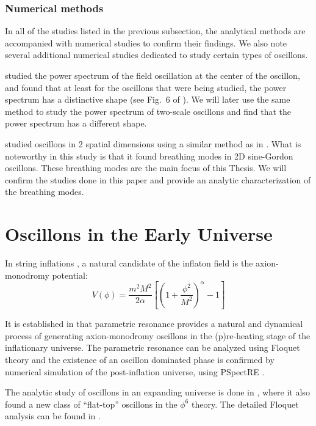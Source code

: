 \documentclass{report}
\begin{document}
\subsubsection{Numerical methods}
In all of the studies listed in the previous subsection, the analytical methods are accompanied with numerical studies to confirm their findings. We also note several additional numerical studies dedicated to study certain types of oscillons.

\cite{Salmi:2012ta} studied the power spectrum of the field oscillation at the center of the oscillon, and found that at least for the oscillons that were being studied, the power spectrum has a distinctive shape (see Fig.~6 of \cite{Hindmarsh:2006ur}). We will later use the same method to study the power spectrum of two-scale oscillons and find that the power spectrum has a different shape.

\cite{Hindmarsh:2006ur} studied oscillons in 2 spatial dimensions using a similar method as in \cite{Salmi:2012ta}. What is noteworthy in this study is that it found breathing modes in 2D sine-Gordon oscillons. These breathing modes are the main focus of this Thesis. We will confirm the studies done in this paper and provide an analytic characterization of the breathing modes.

\section{Oscillons in the Early Universe}
In string inflations \cite{stringInflationBook, McAllister:2008hb, Silverstein:2008sg, Flauger:2009ab}, a natural candidate of the inflaton field is the axion-monodromy potential:
\begin{equation}
  V(\phi) = \frac{m^2M^2}{2\alpha} \left[\left(1+\frac{\phi^2}{M^2}\right)^\alpha -1\right]
\end{equation}

It is established in \cite{Amin:2010dc, Amin:2011hj} that parametric resonance provides a natural and dynamical process of generating axion-monodromy oscillons in the (p)re-heating stage of the inflationary universe. The parametric resonance can be analyzed using Floquet theory and the existence of an oscillon dominated phase is confirmed by numerical simulation of the post-inflation universe, using PSpectRE \cite{Easther:2010qz}.

The analytic study of oscillons in an expanding universe is done in \cite{Amin:2010jq}, where it also found a new class of ``flat-top'' oscillons in the $\phi^6$ theory. The detailed Floquet analysis can be found in \cite{Amin:2010dc}.
\end{document}
